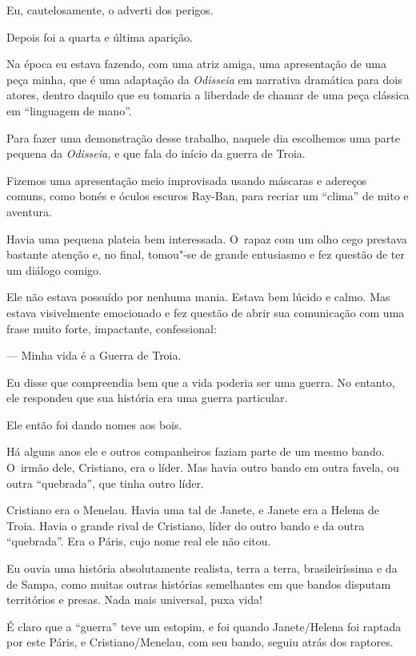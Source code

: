 Eu, cautelosamente, o adverti dos perigos.

\asterisc{}

Depois foi a quarta e última aparição.

Na época eu estava fazendo, com uma atriz amiga, uma apresentação de uma
peça minha, que é uma adaptação da \emph{Odisseia} em narrativa dramática para
dois atores, dentro daquilo que eu tomaria a liberdade de chamar de uma
peça clássica em ``linguagem de mano''.

Para fazer uma demonstração desse trabalho, naquele dia escolhemos uma
parte pequena da \emph{Odisseia,} e que fala do início da guerra de Troia.

Fizemos uma apresentação meio improvisada usando máscaras e adereços
comuns, como bonés e óculos escuros Ray-Ban, para recriar um ``clima'' de
mito e aventura.

Havia uma pequena plateia bem interessada. O~rapaz com um olho cego
prestava bastante atenção e, no final, tomou"-se de grande entusiasmo e
fez questão de ter um diálogo comigo.

Ele não estava possuído por nenhuma mania. Estava bem lúcido e calmo.
Mas estava visivelmente emocionado e fez questão de abrir sua
comunicação com uma frase muito forte, impactante, confessional:

— Minha vida é a Guerra de Troia.

Eu disse que compreendia bem que a vida poderia ser uma guerra. No
entanto, ele respondeu que sua história era uma guerra particular.

Ele então foi dando nomes aos bois.

Há alguns anos ele e outros companheiros faziam parte de um mesmo bando.
O~irmão dele, Cristiano, era o líder. Mas havia outro bando em outra
favela, ou outra ``quebrada'', que tinha outro líder.

Cristiano era o Menelau. Havia uma tal de Janete, e Janete era a Helena
de Troia. Havia o grande rival de Cristiano, líder do outro bando e da
outra ``quebrada''. Era o Páris, cujo nome real ele não citou.

Eu ouvia uma história absolutamente realista, terra a terra,
brasileiríssima e da  de Sampa, como muitas outras histórias
semelhantes em que bandos disputam territórios e presas. Nada mais
universal, puxa vida!

É claro que a ``guerra'' teve um estopim, e foi quando Janete/Helena foi
raptada por este Páris, e Cristiano/Menelau, com seu bando, seguiu atrás
dos raptores.

